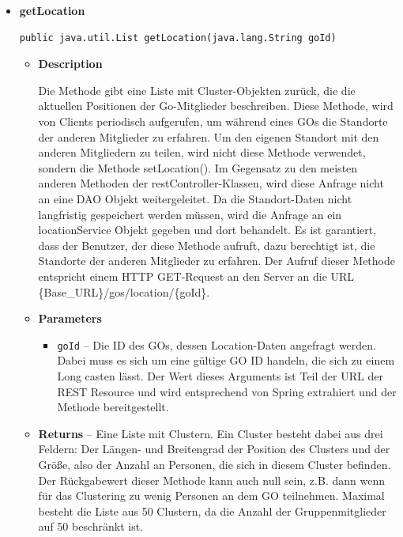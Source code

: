 \documentclass[11pt,a4paper]{article}
\begin{document}
{{{{{{{{{{{{{{{{{{\begin{itemize}
{\begin{itemize}
{\begin{itemize}
  \end{itemize}
}%
\end{itemize}
}%
\item{ 
\hypertarget{edu.kit.pse17.go_app.ClientCommunication.Upstream.GoRestController.getLocation(java.lang.String)}{{\bf  getLocation}\\}
\begin{lstlisting}[frame=none]
public java.util.List getLocation(java.lang.String goId)\end{lstlisting} %
\begin{itemize}
\item{
{\bf  Description}

Die Methode gibt eine Liste mit Cluster-Objekten zurück, die die aktuellen Positionen der Go-Mitglieder beschreiben. Diese Methode, wird von Clients periodisch aufgerufen, um während eines GOs die Standorte der anderen Mitglieder zu erfahren. Um den eigenen Standort mit den anderen Mitgliedern zu teilen, wird nicht diese Methode verwendet, sondern die Methode setLocation(). Im Gegensatz zu den meisten anderen Methoden der restController-Klassen, wird diese Anfrage nicht an eine DAO Objekt weitergeleitet. Da die Standort-Daten nicht langfristig gespeichert werden müssen, wird die Anfrage an ein locationService Objekt gegeben und dort behandelt. Es ist garantiert, dass der Benutzer, der diese Methode aufruft, dazu berechtigt ist, die Standorte der anderen Mitglieder zu erfahren. Der Aufruf dieser Methode entspricht einem HTTP GET-Request an den Server an die URL \{Base\_URL\}/gos/location/\{goId\}.
}
\item{
{\bf  Parameters}
  \begin{itemize}
   \item{
\texttt{goId} -- Die ID des GOs, dessen Location-Daten angefragt werden. Dabei muss es sich um eine gültige GO ID handeln, die sich zu einem Long casten lässt. Der Wert dieses Arguments ist Teil der URL der REST Resource und wird entsprechend von Spring extrahiert und der Methode bereitgestellt.}
  \end{itemize}
}%
\item{{\bf  Returns} -- 
Eine Liste mit Clustern. Ein Cluster besteht dabei aus drei Feldern: Der Längen- und Breitengrad der Position des Clusters und der Größe, also der Anzahl an Personen, die sich in diesem Cluster befinden. Der Rückgabewert dieser Methode kann auch null sein, z.B. dann wenn für das Clustering zu wenig Personen an dem GO teilnehmen. Maximal besteht die Liste aus 50 Clustern, da die Anzahl der Gruppenmitglieder auf 50 beschränkt ist. 
}
\end{itemize}}
\end{itemize}}}}}}}}}}}}}}}}}}}
\end{document}
